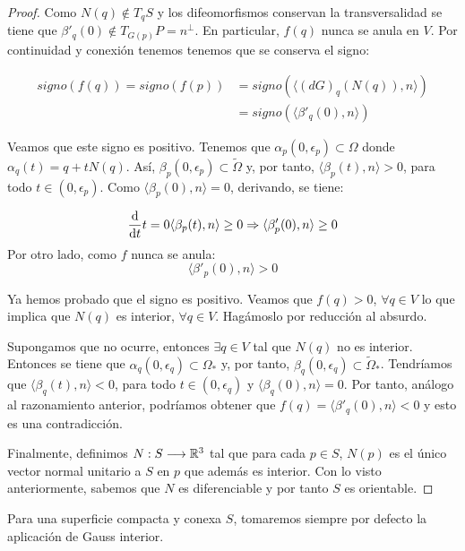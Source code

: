 \begin{proof}
Como $N(q) \not\in T_qS$ y los difeomorfismos conservan la transversalidad se tiene que $\beta'_q(0) \not\in T_{G(p)}P = n^\perp$. En particular, $f(q)$ nunca se anula en $V$. Por continuidad y conexión tenemos tenemos que se conserva el signo:

\begin{align*}
    signo(f(q)) = signo(f(p)) &= signo(\langle (dG)_q(N(q)), n \rangle) \\  &= signo(\langle \beta'_q(0), n \rangle)
\end{align*}

Veamos que este signo es positivo. Tenemos que $\alpha_p(0, \epsilon_p) \subset \Omega$ donde $\alpha_q(t) = q + tN(q)$. Así, $\beta_p(0, \epsilon_p) \subset \tilde{\Omega}$ y, por tanto, $\langle \beta_p(t), n \rangle > 0$, para todo $t \in (0, \epsilon_p)$. Como $\langle \beta_p(0), n \rangle = 0$, derivando, se tiene:

\begin{equation*}
    \diff{}{t}{t=0} \langle \beta_p(t), n \rangle \geq 0 \Rightarrow \langle \beta'_p(0), n \rangle \geq 0
\end{equation*}
%
Por otro lado, como $f$ nunca se anula:
%
\begin{equation*}
    \langle \beta'_p(0), n \rangle > 0
\end{equation*}

Ya hemos probado que el signo es positivo. Veamos que $f(q) > 0$, $\forall q \in V$ lo que implica que $N(q)$ es interior, $\forall q \in V$. Hagámoslo por reducción al absurdo. 

Supongamos que no ocurre, entonces $\exists q \in V$ tal que $N(q)$ no es interior. Entonces se tiene que $\alpha_q(0, \epsilon_q) \subset \Omega_*$ y, por tanto, $\beta_q(0, \epsilon_q) \subset \tilde{\Omega}_*$. Tendríamos que $\langle \beta_q(t), n \rangle < 0$, para todo $t \in (0, \epsilon_q)$ y $\langle \beta_q(0), n \rangle = 0$. Por tanto, análogo al razonamiento anterior, podríamos obtener que $f(q) = \langle \beta'_q(0), n \rangle < 0$ y esto es una contradicción.

Finalmente, definimos $N: S \longrightarrow \mathbb{R}^3$ tal que para cada $p\in S$, $N(p)$ es el único vector normal unitario a $S$ en $p$ que además es interior. Con lo visto anteriormente, sabemos que $N$ es diferenciable y por tanto $S$ es orientable.
\end{proof}

\begin{remark}
Para una superficie compacta y conexa $S$, tomaremos siempre por defecto la aplicación de Gauss interior.
\end{remark}


